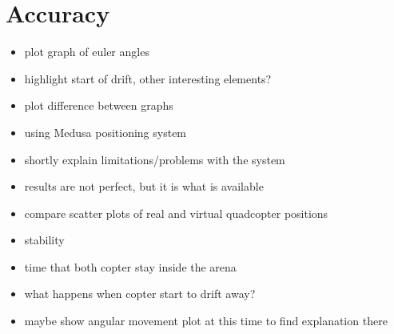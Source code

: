 \section{Accuracy}
\begin{itemize}
\item{plot graph of euler angles}
\item{highlight start of drift, other interesting elements?}
\item{plot difference between graphs}
\end{itemize}
\begin{itemize}

\item{using Medusa positioning system}
\item{shortly explain limitations/problems with the system}
\item{results are not perfect, but it is what is available}
\item{compare scatter plots of real and virtual quadcopter positions}
\end{itemize}

\begin{itemize}
\item{stability}
\item{time that both copter stay inside the arena}
\item{what happens when copter start to drift away?}
\item{maybe show angular movement plot at this time to find explanation there}
\end{itemize}





